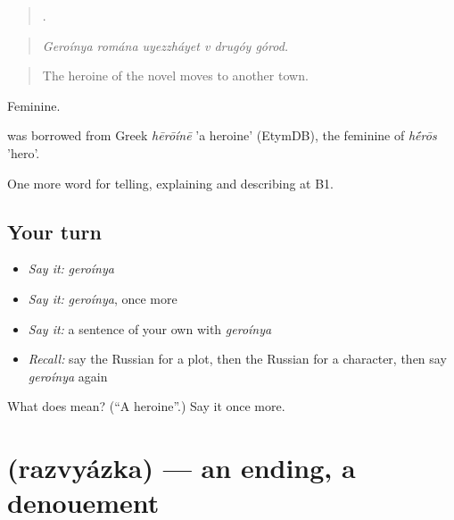 \begin{quote}
     .
\end{quote}

\begin{quote}
\emph{Geroínya romána uyezzháyet v drugóy górod.}
\end{quote}

\begin{quote}
The heroine of the novel moves to another town.
\end{quote}

Feminine.

\begin{cousinweb}
\emph{} was borrowed from Greek \emph{hērōínē} 'a heroine' (EtymDB), the feminine of \emph{h\'{\={e}}rōs} 'hero'.
\end{cousinweb}

\begin{grammarlens}[title={What you've built}]
One more word for telling, explaining and describing at B1.
\end{grammarlens}

\subsection*{Your turn}
\begin{itemize}
\raggedright
  \item \emph{Say it:} \emph{geroínya}
  \item \emph{Say it:} \emph{geroínya}, once more
  \item \emph{Say it:} a sentence of your own with \emph{geroínya}
  \item \emph{Recall:} say the Russian for a plot, then the Russian for a character, then say \emph{geroínya} again
\end{itemize}

\begin{tcolorbox}[breakable,colback=teal!4,colframe=teal!35!black,title={Before you move on}]
What does  mean? (\textquotedblleft{}A heroine\textquotedblright{}.) Say it once more.
\end{tcolorbox}
\section[\texorpdfstring{\ru{развязка} (razvyázka)}{развязка (razvyázka)}]{ (razvyázka) — an ending, a denouement}

\label{lesson:RU-C523-razvyazka}



